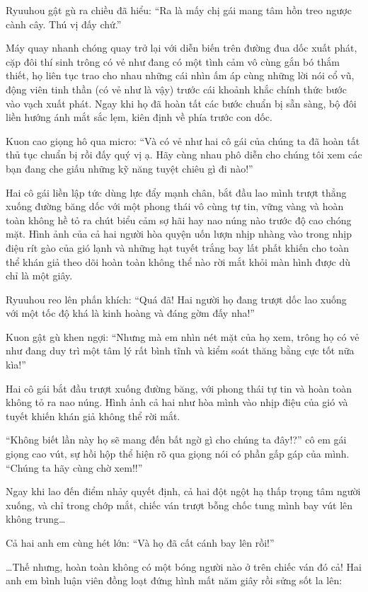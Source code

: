\documentclass[../main.tex]{subfiles}
\begin{document}
Ryuuhou gật gù ra chiều đã hiểu: ``Ra là mấy chị gái mang tâm hồn treo ngược cành cây. Thú vị đấy chứ.''

Máy quay nhanh chóng quay trở lại với diễn biến trên đường đua dốc xuất phát, cặp đôi thí sinh trông có vẻ như đang có một tình cảm vô cùng gắn bó thắm thiết, họ liên tục trao cho nhau những cái nhìn ấm áp cùng những lời nói cổ vũ, động viên tinh thần (có vẻ như là vậy) trước cái khoảnh khắc chính thức bước vào vạch xuất phát. Ngay khi họ đã hoàn tất các bước chuẩn bị sẵn sàng, bộ đôi liền hướng ánh mắt sắc lẹm, kiên định về phía trước con dốc.

Kuon cao giọng hô qua micro: ``Và có vẻ như hai cô gái của chúng ta đã hoàn tất thủ tục chuẩn bị rồi đấy quý vị ạ. Hãy cùng nhau phô diễn cho chúng tôi xem các bạn đang che giấu những kỹ năng tuyệt chiêu gì đi nào!''

Hai cô gái liền lập tức dùng lực đẩy mạnh chân, bắt đầu lao mình trượt thẳng xuống đường băng dốc với một phong thái vô cùng tự tin, vững vàng và hoàn toàn không hề tỏ ra chút biểu cảm sợ hãi hay nao núng nào trước độ cao chóng mặt. Hình ảnh của cả hai người hòa quyện uốn lượn nhịp nhàng vào trong nhịp điệu rít gào của gió lạnh và những hạt tuyết trắng bay lất phất khiến cho toàn thể khán giả theo dõi hoàn toàn không thể nào rời mắt khỏi màn hình được dù chỉ là một giây.

Ryuuhou reo lên phấn khích: ``Quá đã! Hai người họ đang trượt dốc lao xuống với một tốc độ khá là kinh hoàng và đáng gờm đấy nha!''

Kuon gật gù khen ngợi: ``Nhưng mà em nhìn nét mặt của họ xem, trông họ có vẻ như đang duy trì một tâm lý rất bình tĩnh và kiểm soát thăng bằng cực tốt nữa kìa!''

Hai cô gái bắt đầu trượt xuống đường băng, với phong thái tự tin và hoàn toàn không tỏ ra nao núng. Hình ảnh cả hai như hòa mình vào nhịp điệu của gió và tuyết khiến khán giả không thể rời mắt.

``Không biết lần này họ sẽ mang đến bất ngờ gì cho chúng ta đây!?'' cô em gái giọng cao vút, sự hồi hộp thể hiện rõ qua giọng nói có phần gấp gáp của mình. ``Chúng ta hãy cùng chờ xem!!''

Ngay khi lao đến điểm nhảy quyết định, cả hai đột ngột hạ thấp trọng tâm người xuống, và chỉ trong chớp mắt, chiếc ván trượt bỗng chốc tung mình bay vút lên không trung\dots

Cả hai anh em cùng hét lớn: ``Và họ đã cất cánh bay lên rồi!''

\dots Thế nhưng, hoàn toàn không có một bóng người nào ở trên chiếc ván đó cả! Hai anh em bình luận viên đồng loạt đứng hình mất năm giây rồi sửng sốt la lên:
\end{document}

